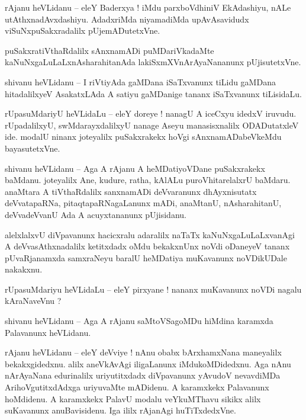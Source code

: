 \documentclass{article}
\begin{document}
\begin{mn}%
rAjanu heVLidanu -- eleY Baderxya ! iMdu parxboVdhiniV EkAdashiyu, nALe utAthxnadAvxdashiyu. 
AdadxriMda niyamadiMda upAvAsavidudx viSuNxpuSakxradalilx pUjemADutetxVne.
\end{mn}

\begin{mn}%
puSakxratiVthaRdalilx sAnxnamADi puMDariVkadaMte kaNuNxgaLuLaLxnAsharahitanAda 
lakiSxmXVnArAyaNananunx pUjisutetxVne.
\end{mn}

\begin{mn}%
shivanu heVLidanu -- I riVtiyAda gaMDana iSaTxvanunx tiLidu gaMDana hitadalilxyeV AsakatxLAda A 
satiyu gaMDanige tananx iSaTxvanunx tiLisidaLu.
\end{mn}

\begin{mn}%
rUpasuMdariyU heVLidaLu -- eleY doreye ! nanagU A iceCxyu idedxV iruvudu. rUpadalilxyU, 
swMdarayxdalilxyU nanage Aseyu manasisxnalilx ODADutatxleV ide. modalU ninanx joteyalilx 
puSakxrakekx hoVgi sAnxnamADabeVkeMdu bayasutetxVne.
\end{mn}

\begin{mn}%
shivanu heVLidanu -- Aga A rAjanu A heMDatiyoVDane puSakxrakekx baMdanu. joteyalilx Ane, kudure, 
ratha, kAlALu puroVhitarelalxrU baMdaru. anaMtara A tiVthaRdalilx sanxnamADi deVvaranunx 
dhAyxnisutatx deVvatapaRNa, pitaqtapaRNagaLanunx mADi, anaMtanU, nAsharahitanU, deVvadeVvanU Ada A 
acuyxtananunx pUjisidanu.
\end{mn}

\begin{mn}%
alelxlalxvU diVpavanunx hacicxralu adaralilx naTaTx kaNuNxgaLuLaLxvanAgi A deVvasAthxnadalilx 
ketitxdadx oMdu bekakxnUnx noVdi oDaneyeV tananx pUvaRjanamxda samxraNeyu baralU heMDatiya 
muKavanunx noVDikUDale nakakxnu.
\end{mn}

\begin{mn}%
rUpasuMdariyu heVLidaLu -- eleY pirxyane ! nananx muKavanunx noVDi nagalu kAraNaveVnu ?
\end{mn}

\begin{mn}%
shivanu heVLidanu -- Aga A rAjanu saMtoVSagoMDu hiMdina karamxda Palavanunx heVLidanu.
\end{mn}

\begin{mn}%
rAjanu heVLidanu -- eleY deVviye ! nAnu obabx bArxhamxNana maneyalilx bekakxgidedxnu. alilx 
aneVkAvAgi iligaLanunx iMdukoMDidedxnu. Aga nAnu nArAyaNana edurinalilx uriyutitxdadx diVpavanunx 
yAvudoV nevavdiMDa ArihoVgutitxdAdxga uriyuvaMte mADidenu. A karamxkekx Palavanunx hoMdidenu. A 
karamxkekx PalavU modalu veYkuMThavu sikikx alilx suKavanunx anuBavisidenu. Iga ililx rAjanAgi 
huTiTxdedxVne.
\end{mn}
\end{document}
